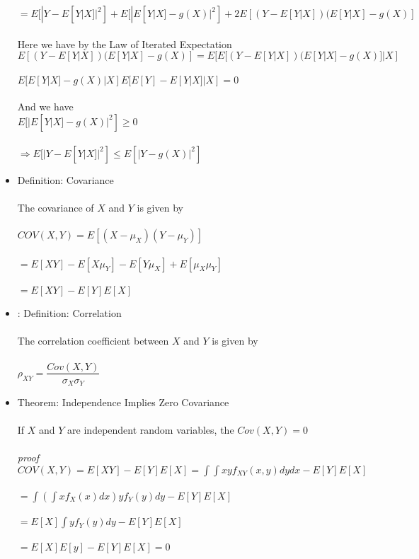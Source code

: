 \documentclass{article}
\begin{document}
\begin{itemize}
    $=E[|Y-E[Y|X]|^2]+E[|E[Y|X]-g(X)|^2]+2E[(Y-E[Y|X])(E[Y|X]-g(X)]$\\\\
    Here we have by the Law of Iterated Expectation\\
    $E[(Y-E[Y|X])(E[Y|X]-g(X)]=E[E[(Y-E[Y|X])(E[Y|X]-g(X)]|X]$\\\\
    $E[E[Y|X]-g(X)|X]E[E[Y]-E[Y|X]|X]=0$\\\\
    And we have\\
    $E[|E[Y|X]-g(X)|^2]\geq0$\\\\
    $\Rightarrow E[|Y-E[Y|X]|^2]\leq E[|Y-g(X)|^2]$\\
    \item Definition: Covariance\\\\
    The covariance of $X$ and $Y$ is given by\\\\
    $COV(X,Y)=E[(X-\mu_X)(Y-\mu_Y)]$\\\\
    $=E[XY]-E[X\mu_Y]-E[Y\mu_X]+E[\mu_X\mu_Y]$\\\\
    $=E[XY]-E[Y]E[X]$\\
    \item: Definition: Correlation\\\\
    The correlation coefficient between $X$ and $Y$ is given by\\\\
    $\rho_{XY}=\dfrac{Cov(X,Y)}{\sigma_X\sigma_Y}$\\
    \item Theorem: Independence Implies Zero Covariance\\\\
    If $X$ and $Y$ are independent random variables, the $Cov(X,Y)=0$\\\\
    \emph{proof}\\
    $COV(X,Y)=E[XY]-E[Y]E[X]=\int\int xyf_{XY}(x,y)dydx-E[Y]E[X]$\\\\
    $=\int(\int xf_X(x)dx)yf_Y(y)dy-E[Y]E[X]$\\\\
    $=E[X]\int yf_Y(y)dy-E[Y]E[X]$\\\\
    $=E[X]E[y]-E[Y]E[X]=0$\\\\

\end{itemize}
\end{document}

